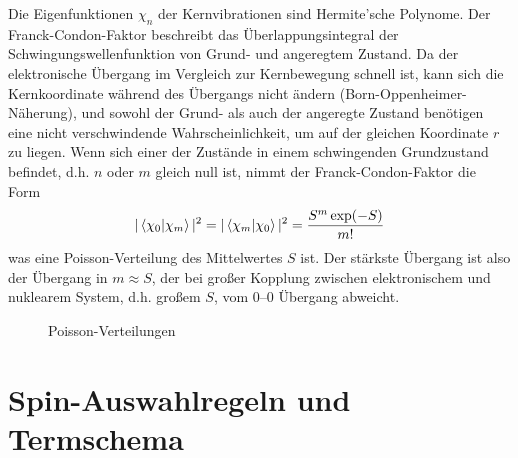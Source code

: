 Die Eigenfunktionen $\chi_n$ der Kernvibrationen sind Hermite'sche Polynome. Der Franck-Condon-Faktor beschreibt das Überlappungsintegral der Schwingungswellenfunktion von Grund- und angeregtem Zustand. Da der elektronische Übergang im Vergleich zur Kernbewegung schnell ist, kann sich die Kernkoordinate während des Übergangs nicht ändern (Born-Oppenheimer-Näherung), und sowohl der Grund- als auch der angeregte Zustand benötigen eine nicht verschwindende Wahrscheinlichkeit, um auf der gleichen Koordinate $r$ zu liegen. Wenn sich einer der Zustände in einem schwingenden Grundzustand befindet, d.h. $n$ oder $m$ gleich null ist, nimmt der Franck-Condon-Faktor die Form
\begin{equation}
 | \braket{ \chi_0 | \chi_m } | ^2  =  | \braket{ \chi_m | \chi_0 } | ^2 = \frac{S^m \exp(-S)}{m!} 
\end{equation}
was eine Poisson-Verteilung des Mittelwertes $S$ ist.  Der stärkste Übergang ist also der Übergang in $m \approx S$, der bei großer Kopplung zwischen elektronischem und nuklearem System, d.h. großem $S$, vom 0--0 Übergang abweicht.

\begin{figure}
  \caption{Poisson-Verteilungen}
\end{figure}


\section{Spin-Auswahlregeln und Termschema}

